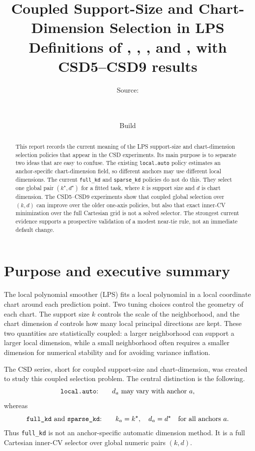 \documentclass[11pt]{article}
\title{\textbf{Coupled Support-Size and Chart-Dimension Selection in LPS}\\[3pt]
\large Definitions of \code{auto}, \code{local.auto}, \code{full\_kd}, and
\code{sparse\_kd}, with CSD5--CSD9 results}
\author{\small Source:\\[-1pt]
\begin{minipage}{0.92\textwidth}
\centering\footnotesize\ttfamily
\detokenize{~/current_projects/geosmooth/dev/methods/lps/status/}\\
\detokenize{lps_coupled_support_chart_dimension_selection_report.tex}
\end{minipage}}
\date{Build \reportbuilddatetime}
\newcommand{\code}[1]{\texttt{#1}}
\begin{document}
\maketitle

\begin{abstract}
This report records the current meaning of the LPS support-size and chart-dimension
selection policies that appear in the CSD experiments.  Its main purpose is to
separate two ideas that are easy to confuse.  The existing \code{local.auto}
policy estimates an anchor-specific chart-dimension field, so different anchors
may use different local dimensions.  The current \code{full\_kd} and
\code{sparse\_kd} policies do not do this.  They select one global pair
$(k^\star,d^\star)$ for a fitted task, where $k$ is support size and $d$ is chart
dimension.  The CSD5--CSD9 experiments show that coupled global selection over
$(k,d)$ can improve over the older one-axis policies, but also that exact
inner-CV minimization over the full Cartesian grid is not a solved selector.
The strongest current evidence supports a prospective validation of a modest
near-tie rule, not an immediate default change.
\end{abstract}

\section{Purpose and executive summary}

The local polynomial smoother (LPS) fits a local polynomial in a local coordinate
chart around each prediction point.  Two tuning choices control the geometry of
each chart.  The support size $k$ controls the scale of the neighborhood, and the
chart dimension $d$ controls how many local principal directions are kept.  These
two quantities are statistically coupled: a larger neighborhood can support a
larger local dimension, while a small neighborhood often requires a smaller
dimension for numerical stability and for avoiding variance inflation.

The CSD series, short for coupled support-size and chart-dimension, was created
to study this coupled selection problem.  The central distinction is the
following.
\[
  \text{\code{local.auto}:}\qquad d_a \text{ may vary with anchor } a,
\]
whereas
\[
  \text{\code{full\_kd} and \code{sparse\_kd}:}\qquad
  k_a=k^\star,\quad d_a=d^\star \quad \text{for all anchors } a.
\]
Thus \code{full\_kd} is not an anchor-specific automatic dimension method.  It is
a full Cartesian inner-CV selector over global numeric pairs $(k,d)$.
\end{document}
